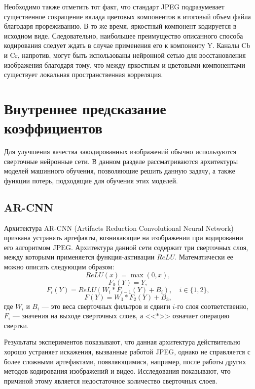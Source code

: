 \documentclass[times,specification,annotation]{itmo-student-thesis}
\begin{document}
Необходимо также отметить тот факт, что стандарт JPEG подразумевает существенное сокращение вклада цветовых компонентов в итоговый объем файла благодаря прореживанию. В то же время, яркостный компонент кодируется в исходном виде. Следовательно, наибольшее преимущество описанного способа кодирования следует ждать в случае применения его к компоненту Y. Каналы Cb и Cr, напротив, могут быть использованы нейронной сетью для восстановления изображения благодаря тому, что между яркостным и цветовыми компонентами существует локальная пространственная корреляция.

\section{Внутреннее предсказание коэффициентов}\label{section:intra-prediction}

Для улучшения качества закодированных изображений обычно используются сверточные нейронные сети. В данном разделе рассматриваются архитектуры моделей машинного обучения, позволяющие решить данную задачу, а также функции потерь, подходящие для обучения этих моделей.

\subsection{AR-CNN}\label{subsection:ar-cnn}

Архитектура AR-CNN (Artifacts Reduction Convolutional Neural Network)~\cite{ar-cnn-overview} призвана устранять артефакты, возникающие на изображении при кодировании его алгоритмом JPEG. Архитектура данной сети содержит три сверточных слоя, между которыми применяется функция-активации $ReLU$. Математически ее можно описать следующим образом:
\[
    ReLU(x) = \max(0, x),
\]
\[
    F_0(Y) = Y,
\]
\[
    F_i(Y) = ReLU(W_i * F_{i-1}(Y) + B_i),\quad i \in \{1, 2\},
\]
\[
    F(Y) = W_3 * F_2(Y) + B_3,
\]
где $W_i$ и $B_i$ --- это веса сверточных фильтров и сдвиги $i$-го слоя соответственно, $F_i$ --- значения на выходе сверточных слоев, а <<$*$>> означает операцию свертки.\par

Результаты экспериментов показывают, что данная архитектура действительно хорошо устраняет искажения, вызванные работой JPEG, однако не справляется с более сложными артефактами, появляющимися, например, после работы других методов кодирования изображений и видео. Исследования показывают, что причиной этому является недостаточное количество сверточных слоев.
\end{document}
